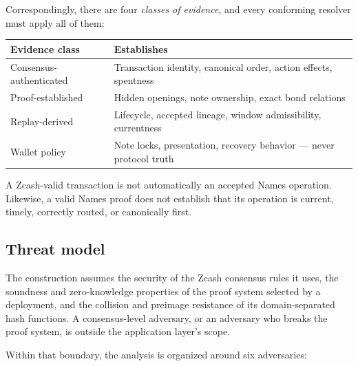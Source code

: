 \documentclass[11pt]{article}
\begin{document}
Correspondingly, there are four \emph{classes of evidence}, and every
conforming resolver must apply all of them:

\begin{center}
\small
\begin{tabular}{>{\raggedright\arraybackslash}p{}>{\raggedright\arraybackslash}p{}}
\toprule
Evidence class & Establishes \\
\midrule
Consensus-authenticated & Transaction identity, canonical order, action effects, spentness \\
Proof-established & Hidden openings, note ownership, exact bond relations \\
Replay-derived & Lifecycle, accepted lineage, window admissibility, currentness \\
Wallet policy & Note locks, presentation, recovery behavior --- never protocol truth \\
\bottomrule
\end{tabular}
\end{center}

A Zcash-valid transaction is not automatically an accepted Names operation.
Likewise, a valid Names proof does not establish that its operation is
current, timely, correctly routed, or canonically first.

\subsection{Threat model}
\label{sec:threat}

The construction assumes the security of the Zcash consensus rules it uses,
the soundness and zero-knowledge properties of the proof system selected by a
deployment, and the collision and preimage resistance of its domain-separated
hash functions. A consensus-level adversary, or an adversary who breaks the
proof system, is outside the application layer's scope.

Within that boundary, the analysis is organized around six adversaries:
\end{document}
